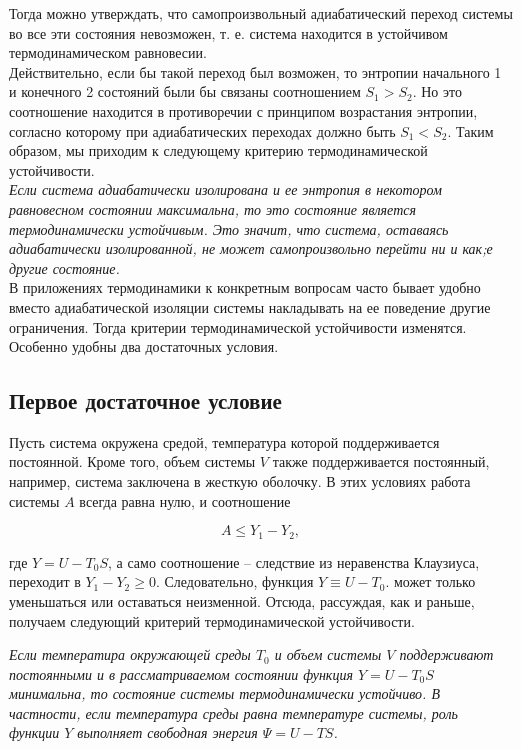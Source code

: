 \documentclass[a4paper,14pt]{article} %
\begin{document}
Тогда можно утверждать, что
самопроизвольный адиабатический переход системы во все эти состояния невозможен, т. е. система находится в устойчивом термодинамическом равновесии.\\

Действительно, если бы такой переход
был возможен, то энтропии начального 1 и конечного 2 состояний
были бы связаны соотношением $S_1 > S_2$. Но это соотношение находится в противоречии с принципом возрастания энтропии, согласно
которому при адиабатических переходах должно быть $S_1 < S_2$.
Таким образом, мы приходим к следующему критерию термодинамической устойчивости.\\

\textit{Если система адиабатически изолирована и ее энтропия в некотором равновесном состоянии максимальна, то это состояние
является термодинамически устойчивым. Это значит, что система,
оставаясь адиабатически изолированной, не может самопроизвольно
перейти ни и как;е другие состояние.}\\

В приложениях термодинамики к конкретным вопросам часто
бывает удобно вместо адиабатической изоляции системы накладывать
на ее поведение другие ограничения. Тогда критерии термодинамической устойчивости изменятся. Особенно удобны два достаточных условия. 

\subsection{Первое достаточное условие}

Пусть система окружена средой, температура которой поддерживается постоянной. Кроме того, объем системы $V$ также поддерживается постоянный, например, система заключена в жесткую оболочку. В этих условиях работа системы $A$ всегда равна нулю, и соотношение

\begin{equation*}
A\leqslant Y_{1}-Y_{2},
\end{equation*}

где $Y = U - T_0S$, а само соотношение -- следствие из неравенства Клаузиуса, переходит в $Y_{1}-Y_{2} \geqslant 0 .$ Следовательно, функция $Y \equiv U-T_{0}$. может только уменьшаться или оставаться неизменной. Отсюда, рассуждая, как и раньше, получаем следующий критерий термодинамической устойчивости.

\textit{Если температира окружающей среды $T_{0}$ и объем системы $V$ поддерживают постоянными и в рассматриваемом состоянии функция $Y=U-T_{0}S$ минимальна, то состояние системы термодинамически устойчиво. В частности, если температура среды равна температуре системы, роль функции $Y$ выполняет свободная энергия $\Psi=U - T S$.}
\end{document}
